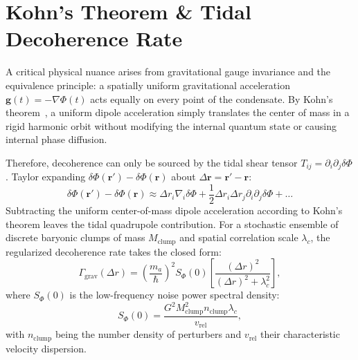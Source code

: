 \documentclass[aps,prd,twocolumn,superscriptaddress,nofootinbib,floatfix,longbibliography]{revtex4-2}
\begin{document}
\section{Kohn's Theorem \& Tidal Decoherence Rate}
\label{sec:kohn}

A critical physical nuance arises from gravitational gauge invariance and the equivalence principle: a spatially uniform gravitational acceleration $\mathbf{g}(t) = -\nabla \Phi(t)$ acts equally on every point of the condensate. By Kohn's theorem~\cite{Kohn1961}, a uniform dipole acceleration simply translates the center of mass in a rigid harmonic orbit without modifying the internal quantum state or causing internal phase diffusion.

Therefore, decoherence can only be sourced by the tidal shear tensor $T_{ij} = \partial_i \partial_j \delta\Phi$. Taylor expanding $\delta\Phi(\mathbf{r}') - \delta\Phi(\mathbf{r})$ about $\Delta \mathbf{r} = \mathbf{r}' - \mathbf{r}$:
\begin{equation}
\delta\Phi(\mathbf{r}') - \delta\Phi(\mathbf{r}) \approx \Delta r_i \nabla_i \delta\Phi + \frac{1}{2} \Delta r_i \Delta r_j \partial_i \partial_j \delta\Phi + \dots
\end{equation}
Subtracting the uniform center-of-mass dipole acceleration according to Kohn's theorem leaves the tidal quadrupole contribution. For a stochastic ensemble of discrete baryonic clumps of mass $M_{\text{clump}}$ and spatial correlation scale $\lambda_c$, the regularized decoherence rate takes the closed form:
\begin{equation}
\Gamma_{\text{grav}}(\Delta r) = \left( \frac{m_a}{\hbar} \right)^2 S_\Phi(0) \left[ \frac{(\Delta r)^2}{(\Delta r)^2 + \lambda_c^2} \right],
\label{eq:rate}
\end{equation}
where $S_\Phi(0)$ is the low-frequency noise power spectral density:
\begin{equation}
S_\Phi(0) = \frac{G^2 M_{\text{clump}}^2 n_{\text{clump}} \lambda_c}{v_{\text{rel}}},
\end{equation}
with $n_{\text{clump}}$ being the number density of perturbers and $v_{\text{rel}}$ their characteristic velocity dispersion.
\end{document}
